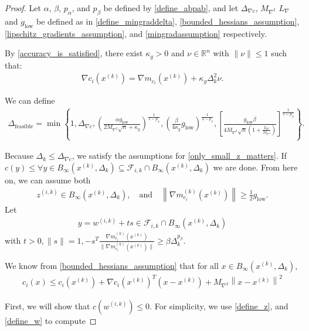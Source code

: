 \documentclass{article}
\theoremstyle{case}
\numberwithin{theorem}{subsection}
\newcommand{\dfeas}{{\Delta_{\textrm{feasible}}}}
\newcommand{\dk}{\Delta_k}
\newcommand{\fik}{{\mathcal F_{i, k}}}
\newcommand{\gmcik}{{\nabla m_{c_i}^{(k)}\left(\xk\right)}}
\newcommand{\hgik}{{\frac{\nabla m^{(k)}_{c_i}(\xk)}{\|\nabla m^{(k)}_{c_i}(\xk)\|}}}
\newcommand{\lipgrad}{{L_{\nabla}}}
\newcommand{\maxhessian}{{M_{\nabla^2}}}
\newcommand{\mingraddelta}{{\Delta_{\nabla c}}}
\newcommand{\mingrad}{{ g_{\textrm{low}} }}
\newcommand{\Rn}{\mathbb R^n}
\newcommand{\tr}{{ B_{\infty}\left(\xk, \dk\right) }}
\newcommand{\wik}{{w^{(i, k)}}}
\newcommand{\xk}{{x^{(k)}}}
\newcommand{\zik}{{z^{(i, k)}}}
\begin{document}
\begin{proof}
Let
$\alpha$, $\beta$, $p_{\alpha}$, and $p_{\beta}$
be defined by
\cref{define_abpab},
and let
$\mingraddelta$,
$\maxhessian$
$\lipgrad$
and $\mingrad$
be defined as in
\cref{define_mingraddelta},
\cref{bounded_hessians_assumption},
\cref{lipschitz_gradients_assumption},
and \cref{mingradassumption}
respectively.

By \cref{accuracy_is_satisfied}, there exist $\kappa_g > 0$ and $\nu\in\Rn$ with $\|\nu\|\le 1$ such that:
\begin{align}
\nabla c_i(\xk) = \nabla m_{c_i}(\xk) + \kappa_g\dk^2\nu. \label{model_error_for_gradient}
\end{align}

We can define
\begin{align}
\dfeas = \min\left\{
1,
\mingraddelta,
\left(\frac{\alpha \mingrad}{2 \maxhessian \sqrt{n} + \kappa_g}\right)^{\frac 1 {1-p_{\alpha}}},
\left(\frac{\beta}{4\kappa_g}\mingrad\right)^{\frac 1 {2 - p_{\beta}}},
\left[\frac {\mingrad  \beta} {4\maxhessian\sqrt{n}\left(1 + \frac {\lipgrad} \maxhessian \right)}\right]^{\frac1 {1 - p_{\beta}} }
\right\}. \label{define_delta_feasible}
\end{align}



Because $\dk \le \mingraddelta$, we satisfy the assumptions for \cref{only_small_z_matters}.
If $c(y) \le \forall y \in \tr \subseteq \fik \cap \tr$ we are done.
From here on, we can assume both
\begin{align}
\zik \in \tr, \quad \textrm{and} \quad \left\|\gmcik\right\| \ge \frac 1 2 \mingrad. \label{z_is_active}
\end{align}
Let
\begin{align}
y = \wik + ts \in \fik \cap \tr \label{t_is_bounded}
\end{align}
with $t > 0, \|s\| = 1, -s^T\hgik \ge \beta \dk^{p_{\beta}}$.

We know from \cref{bounded_hessians_assumption} that for all $x \in \tr$,
\begin{align}
c_i(x) \le c_i(\xk) + \nabla c_i(\xk)^T(x - \xk) + \maxhessian \left \|x - \xk \right\|^2 \label{constraint_lower_bound}
\end{align}

First, we will show that $c(\wik) \le 0$.
For simplicity, we use \cref{define_z}, and \cref{define_w} to compute



\end{proof}
\end{document}
